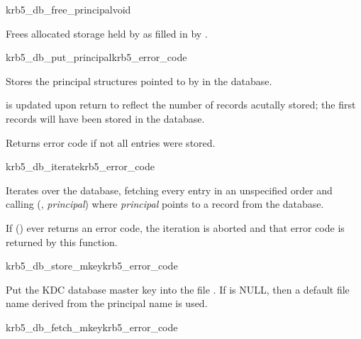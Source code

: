 \begin{funcdecl}{krb5_db_free_principal}{void}{\funcin}
\end{funcdecl}

Frees allocated storage held by  as filled in by
.


\begin{funcdecl}{krb5_db_put_principal}{krb5_error_code}{\funcin}
\end{funcdecl}

Stores the  principal structures pointed to by
 in the database.

 is updated upon return to reflect the number of records
acutally stored; the first  records will have been
stored in the database.

Returns error code if not all entries were stored.

\begin{funcdecl}{krb5_db_iterate}{krb5_error_code}{\funcin}
\funcendfuncarg
{}
\end{funcdecl}

Iterates over the database, fetching every entry in an unspecified order
and calling (,
{\sl principal}) where {\sl principal} points to a record from the database.

If () ever returns an error code, the iteration is
aborted and that error code is returned by this function.

\begin{funcdecl}{krb5_db_store_mkey}{krb5_error_code}{\funcin}
\end{funcdecl}

Put the KDC database master key into the file . If
 is NULL, then a default file name derived from the
principal name  is used.

\begin{funcdecl}{krb5_db_fetch_mkey}{krb5_error_code}{\funcin}
\funcinout
{}
\end{funcdecl}

